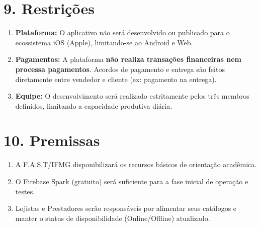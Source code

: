 \documentclass[11pt, a4paper]{article}
\begin{document}
\section*{\textcolor{headerblue}{9. Restrições}}
\begin{enumerate}[label=\arabic*.]
    \item \textbf{Plataforma:} O aplicativo não será desenvolvido ou publicado para o ecossistema iOS (Apple), limitando-se ao Android e Web.
    \item \textbf{Pagamentos:} A plataforma \textbf{não realiza transações financeiras nem processa pagamentos}. Acordos de pagamento e entrega são feitos diretamente entre vendedor e cliente (ex: pagamento na entrega).
    \item \textbf{Equipe:} O desenvolvimento será realizado estritamente pelos três membros definidos, limitando a capacidade produtiva diária.
\end{enumerate}

\section*{\textcolor{headerblue}{10. Premissas}}
\begin{enumerate}[label=\arabic*.]
    \item A F.A.S.T/IFMG disponibilizará os recursos básicos de orientação acadêmica.
    \item O Firebase Spark (gratuito) será suficiente para a fase inicial de operação e testes.
    \item Lojistas e Prestadores serão responsáveis por alimentar seus catálogos e manter o status de disponibilidade (Online/Offline) atualizado.
\end{enumerate}
\end{document}
